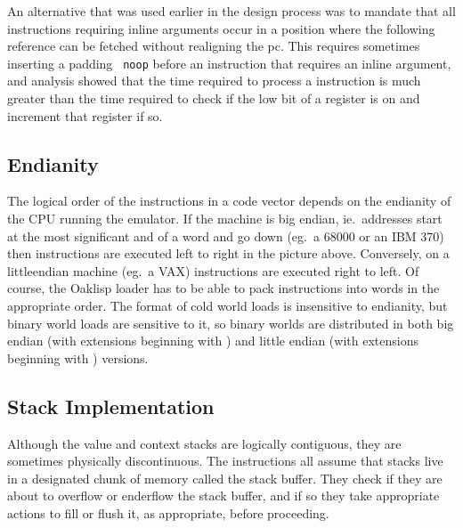 An alternative that was used earlier in the design process was to
mandate that all instructions requiring inline arguments occur in a
position where the following reference can be fetched without
realigning the pc.  This requires sometimes inserting a padding {\tt
noop} before an instruction that requires an inline argument, and
analysis showed that the time required to process a 
instruction is much greater than the time required to check if the low
bit of a register is on and increment that register if so.


\subsection{Endianity}

The logical order of the instructions in a code vector depends on the
endianity of the CPU running the emulator.  If the machine is big
endian, ie.\ addresses start at the most significant and of a word and
go down (eg.\ a 68000 or an IBM 370) then instructions are executed
left to right in the picture above.  Conversely, on a littleendian
machine (eg.\ a VAX) instructions are executed right to left.  Of
course, the Oaklisp loader has to be able to pack instructions into
words in the appropriate order.  The format of cold world loads is
insensitive to endianity, but binary world loads are sensitive to it,
so binary worlds are distributed in both big endian (with extensions
beginning with ) and little endian (with extensions beginning
with ) versions.


\subsection{Stack Implementation} \label{sec:stackimpl}

Although the value and context stacks are logically contiguous, they
are sometimes physically discontinuous.  The instructions all assume
that stacks live in a designated chunk of memory called the stack
buffer.  They check if they are about to overflow or enderflow the
stack buffer, and if so they take appropriate actions to fill or flush
it, as appropriate, before proceeding.

